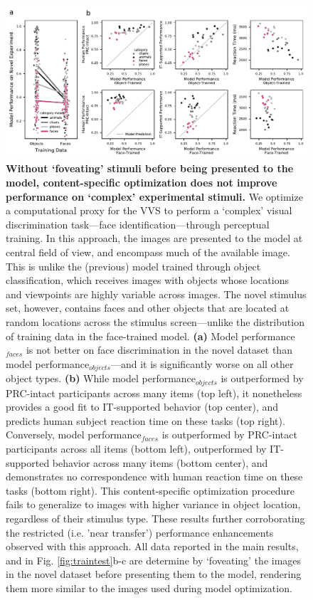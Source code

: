 \documentclass[11pt]{article}
\begin{document}
\begin{figure}[ht]
\centering
\includegraphics[width=\linewidth]{figures/S4}
\renewcommand{\figurename}{Supplementary Figure}
\caption{\textbf{ Without `foveating' stimuli before being presented to the model, content-specific optimization does not improve performance on `complex' experimental stimuli.} We optimize a computational proxy for the VVS to perform a ‘complex’ visual discrimination task---face identification---through perceptual training. In this approach, the images are presented to the model at central field of view, and encompass much of the available image. This is unlike the (previous) model trained through object classification, which receives images with objects whose locations and viewpoints are highly variable across images. The novel stimulus set, however, contains faces and other objects that are located at random locations across the stimulus screen---unlike the distribution of training data in the face-trained model. \textbf{(a)} Model performance$_{faces}$ is not better on face discrimination in the novel dataset than model performance$_{objects}$---and it is significantly worse on all other object types. \textbf{(b)} While model performance$_{objects}$ is outperformed by PRC-intact participants across many items (top left), it nonetheless provides a good fit to IT-supported behavior (top center), and predicts human subject reaction time on these tasks (top right). Conversely, model performance$_{faces}$ is outperformed by PRC-intact participants across all items (bottom left), outperformed by IT-supported behavior across many items (bottom center), and demonstrates no correspondence with human reaction time on these tasks (bottom right). This content-specific optimization procedure fails to generalize to images with higher variance in object location, regardless of their stimulus type. These results further corroborating the restricted (i.e. 'near transfer') performance enhancements observed with this approach. All data reported in the main results, and in Fig. \ref{fig:traintest}b-c are determine by `foveating' the images in the novel dataset before presenting them to the model, rendering them more similar to the images used during model optimization.}
\label{fig:compare_readouts_unfoveated}
\end{figure}
\end{document}
